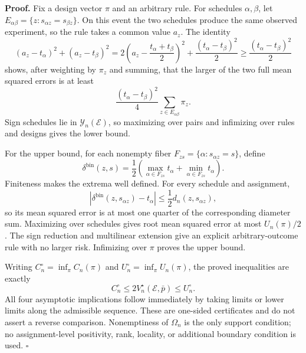 \textbf{Proof.}
Fix a design vector \(\pi\) and an arbitrary rule. For schedules \(\alpha,\beta\), let \(E_{\alpha\beta}=\{z:s_{\alpha z}=s_{\beta z}\}\). On this event the two schedules produce the same observed experiment, so the rule takes a common value \(a_z\). The identity
\[
 (a_z-t_\alpha)^2+(a_z-t_\beta)^2
 =2\left(a_z-\frac{t_\alpha+t_\beta}{2}\right)^2
 +\frac{(t_\alpha-t_\beta)^2}{2}
 \ge\frac{(t_\alpha-t_\beta)^2}{2}
\]
shows, after weighting by \(\pi_z\) and summing, that the larger of the two full mean squared errors is at least
\[
 \frac{(t_\alpha-t_\beta)^2}{4}
 \sum_{z\in E_{\alpha\beta}}\pi_z.
\]
Sign schedules lie in \(\mathcal Y_n(\mathcal E)\), so maximizing over pairs and infimizing over rules and designs gives the lower bound.

For the upper bound, for each nonempty fiber \(F_{zs}=\{\alpha:s_{\alpha z}=s\}\), define
\[
 \delta^{\mathrm{bin}}(z,s)=\frac12
 \left(\max_{\alpha\in F_{zs}}t_\alpha+\min_{\alpha\in F_{zs}}t_\alpha\right).
\]
Finiteness makes the extrema well defined. For every schedule and assignment,
\[
 |\delta^{\mathrm{bin}}(z,s_{\alpha z})-t_\alpha|
 \le\frac12d_n(z,s_{\alpha z}),
\]
so its mean squared error is at most one quarter of the corresponding diameter sum. Maximizing over schedules gives root mean squared error at most \(U_n(\pi)/2\). The sign reduction and multilinear extension give an explicit arbitrary-outcome rule with no larger risk. Infimizing over \(\pi\) proves the upper bound.

Writing \(C_n^\circ=\inf_\pi C_n(\pi)\) and \(U_n^\circ=\inf_\pi U_n(\pi)\), the proved inequalities are exactly
\[
 C_n^\circ\le2V_n^\star(\mathcal E,\bar p)\le U_n^\circ.
\]
All four asymptotic implications follow immediately by taking limits or lower limits along the admissible sequence. These are one-sided certificates and do not assert a reverse comparison. Nonemptiness of \(\Omega_n\) is the only support condition; no assignment-level positivity, rank, locality, or additional boundary condition is used. \(\square\)